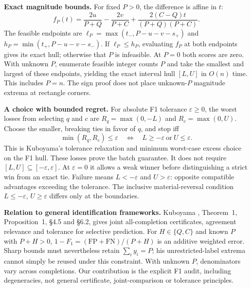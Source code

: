 \documentclass[a4paper]{esannV2}
\newcommand{\F}{F_1}
\begin{document}
\smallskip\noindent\textbf{Exact magnitude bounds.}
For fixed $P>0$, the difference is affine in $t$:
\begin{equation}\label{eq:fixed}
 f_P(t)=\frac{2u}{P+Q}-\frac{2v}{P+C}
          +\frac{2(C-Q)t}{(P+Q)(P+C)}.
\end{equation}
The feasible endpoints are
$\ell_P=\max(t_-,P-u-v-s_+)$ and
$h_P=\min(t_+,P-u-v-s_-)$.
If $\ell_P\le h_P$, evaluating $f_P$ at both endpoints gives its exact hull;
otherwise that $P$ is infeasible. At $P=0$ both scores are zero. With unknown
$P$, enumerate feasible integer counts $P$ and take the smallest and largest
of these endpoints, yielding the exact interval hull $[L,U]$ in $O(n)$ time.
This includes $P=n$. The sign proof does not place unknown-$P$
magnitude extrema at rectangle corners.

\smallskip\noindent\textbf{A choice with bounded regret.}
For absolute F1 tolerance $\varepsilon\ge0$, the worst losses from selecting
$q$ and $c$ are $R_q=\max(0,-L)$ and $R_c=\max(0,U)$.
Choose the smaller, breaking ties in favor of $q$, and stop iff
\begin{equation}\label{eq:stop}
 \min(R_q,R_c)\le\varepsilon
 \quad\Longleftrightarrow\quad L\ge-\varepsilon\ \text{or}\ U\le\varepsilon.
\end{equation}
This is Kuboyama's tolerance relaxation and minimum worst-case excess choice
\cite[\S3, \S5]{kuboyama2026} on the F1 hull. These losses prove the batch guarantee.
It does not require $[L,U]\subseteq[-\varepsilon,\varepsilon]$.
At $\varepsilon=0$ it allows a weak winner before distinguishing a strict win
from an exact tie. Failure means $L<-\varepsilon$ and $U>\varepsilon$: opposite compatible
advantages exceeding the tolerance. The inclusive material-reversal condition $L\le-\varepsilon$,
$U\ge\varepsilon$ differs only at the boundaries.

\medskip\noindent\textbf{Relation to general identification frameworks.}
Kuboyama \cite{kuboyama2026}, Theorem~1, Proposition~1,
\S4.5 and \S6.2, gives joint all-completion certificates, agreement relevance
and tolerance for selective prediction. For $H\in\{Q,C\}$ and known $P$ with $P+H>0$, $1-\F=(\mathrm{FP}+\mathrm{FN})/(P+H)$ is an additive
weighted error. Sharp bounds must nevertheless retain $\sum_i y_i=P$;
his unrestricted-label extrema cannot simply be reused under this constraint.
With unknown $P$, denominators vary across completions. Our contribution is the explicit F1 audit, including degeneracies,
not general certificate, joint-comparison or tolerance principles.
\end{document}
